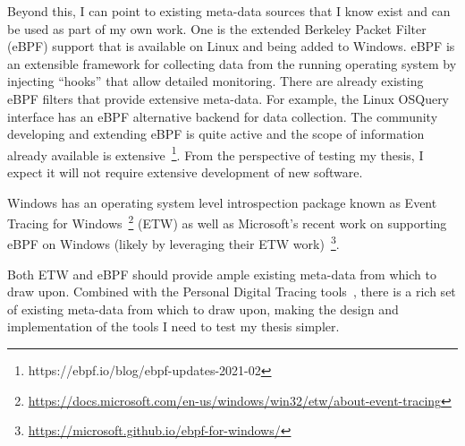 Beyond this, I can point to existing meta-data sources that I know exist and can
be used as part of my own work.  One is the extended Berkeley Packet Filter
(eBPF) support that is available on Linux and being added to Windows.  eBPF is
an extensible framework for collecting data from the running operating system by
injecting ``hooks'' that allow detailed monitoring.  There are already existing
eBPF filters that provide extensive meta-data.  For example, the Linux OSQuery
interface has an eBPF alternative backend for data collection.  The community
developing and extending eBPF is quite active and the scope of information
already available is
extensive~\footnote{https://ebpf.io/blog/ebpf-updates-2021-02}.  From the
perspective of testing my thesis, I expect it will not require extensive
development of new software.

Windows has an operating system level introspection package known as
Event Tracing for
Windows~\footnote{\url{https://docs.microsoft.com/en-us/windows/win32/etw/about-event-tracing}}
(ETW)
as well as Microsoft's recent work on supporting eBPF on Windows (likely by
leveraging their ETW
work)~\footnote{\url{https://microsoft.github.io/ebpf-for-windows/}}.

Both ETW and eBPF should provide ample existing meta-data from which to draw
upon.  Combined with the Personal Digital Tracing tools~\cite{vianna2014a}, there
is a rich set of existing meta-data from which to draw upon, making the design
and implementation of the tools I need to test my thesis simpler.

\endinput

